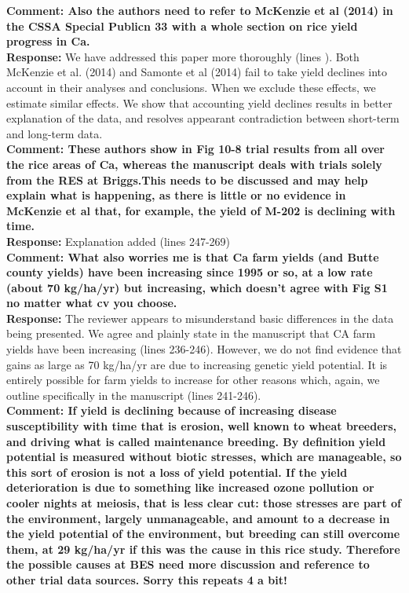 \documentclass{article} \usepackage[margin=1in]{geometry}
\begin{document}
\textbf{Comment: Also the authors need to refer to McKenzie et al
  (2014) in the CSSA Special Publicn 33 with a whole section on rice
  yield progress in Ca.}\\

\textbf{Response:} We have addressed this paper more
thoroughly (lines ). Both McKenzie et al. (2014) and Samonte et
al (2014) fail to take yield declines into account in their analyses
and conclusions.  When we exclude these effects, we estimate similar
effects. We show that accounting yield declines results in better
explanation of the data, and resolves appearant contradiction between
short-term and long-term data. \\

\textbf{Comment: These authors show in Fig 10-8 trial results from all
  over the rice areas of Ca, whereas the manuscript deals with trials
  solely from the RES at Briggs.This needs to be discussed and may
  help explain what is happening, as there is little or no evidence in
  McKenzie et al that, for example, the yield of M-202 is declining
  with time.}\\

\textbf{Response:} Explanation added (lines 247-269)\\

\textbf{Comment: What also worries me is that Ca farm yields (and
  Butte county yields) have been increasing since 1995 or so, at a low
  rate (about 70 kg/ha/yr) but increasing, which doesn’t agree with
  Fig S1 no matter what cv you choose.}\\

\textbf{Response:} The reviewer appears to misunderstand basic
differences in the data being presented. We agree and plainly state in
the manuscript that CA farm yields have been increasing (lines
236-246). However, we do not find evidence that gains as large as 70
kg/ha/yr are due to increasing genetic yield potential. It is entirely
possible for farm yields to increase for other reasons which, again,
we outline specifically in the manuscript (lines 241-246).\\

\textbf{Comment: If yield is declining because of increasing disease
  susceptibility with time that is erosion, well known to wheat
  breeders, and driving what is called maintenance breeding. By
  definition yield potential is measured without biotic stresses,
  which are manageable, so this sort of erosion is not a loss of yield
  potential. If the yield deterioration is due to something like
  increased ozone pollution or cooler nights at meiosis, that is less
  clear cut: those stresses are part of the environment, largely
  unmanageable, and amount to a decrease in the yield potential of the
  environment, but breeding can still overcome them, at 29 kg/ha/yr if
  this was the cause in this rice study. Therefore the possible causes
  at BES need more discussion and reference to other trial data
  sources. Sorry this repeats 4 a bit!}\\
\end{document}
